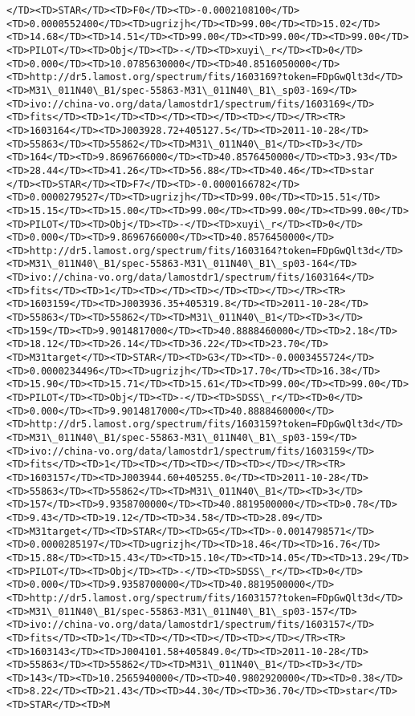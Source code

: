 \documentclass[11pt]{article}
\begin{document}
\begin{Verbatim}[commandchars=\\\{\}]
</TD><TD>STAR</TD><TD>F0</TD><TD>-0.0002108100</TD><TD>0.0000552400</TD><TD>ugrizjh</TD><TD>99.00</TD><TD>15.02</TD><TD>14.68</TD><TD>14.51</TD><TD>99.00</TD><TD>99.00</TD><TD>99.00</TD><TD>PILOT</TD><TD>Obj</TD><TD>-</TD><TD>xuyi\_r</TD><TD>0</TD><TD>0.000</TD><TD>10.0785630000</TD><TD>40.8516050000</TD><TD>http://dr5.lamost.org/spectrum/fits/1603169?token=FDpGwQlt3d</TD><TD>M31\_011N40\_B1/spec-55863-M31\_011N40\_B1\_sp03-169</TD><TD>ivo://china-vo.org/data/lamostdr1/spectrum/fits/1603169</TD><TD>fits</TD><TD>1</TD><TD></TD><TD></TD><TD></TD></TR><TR><TD>1603164</TD><TD>J003928.72+405127.5</TD><TD>2011-10-28</TD><TD>55863</TD><TD>55862</TD><TD>M31\_011N40\_B1</TD><TD>3</TD><TD>164</TD><TD>9.8696766000</TD><TD>40.8576450000</TD><TD>3.93</TD><TD>28.44</TD><TD>41.26</TD><TD>56.88</TD><TD>40.46</TD><TD>star     </TD><TD>STAR</TD><TD>F7</TD><TD>-0.0000166782</TD><TD>0.0000279527</TD><TD>ugrizjh</TD><TD>99.00</TD><TD>15.51</TD><TD>15.15</TD><TD>15.00</TD><TD>99.00</TD><TD>99.00</TD><TD>99.00</TD><TD>PILOT</TD><TD>Obj</TD><TD>-</TD><TD>xuyi\_r</TD><TD>0</TD><TD>0.000</TD><TD>9.8696766000</TD><TD>40.8576450000</TD><TD>http://dr5.lamost.org/spectrum/fits/1603164?token=FDpGwQlt3d</TD><TD>M31\_011N40\_B1/spec-55863-M31\_011N40\_B1\_sp03-164</TD><TD>ivo://china-vo.org/data/lamostdr1/spectrum/fits/1603164</TD><TD>fits</TD><TD>1</TD><TD></TD><TD></TD><TD></TD></TR><TR><TD>1603159</TD><TD>J003936.35+405319.8</TD><TD>2011-10-28</TD><TD>55863</TD><TD>55862</TD><TD>M31\_011N40\_B1</TD><TD>3</TD><TD>159</TD><TD>9.9014817000</TD><TD>40.8888460000</TD><TD>2.18</TD><TD>18.12</TD><TD>26.14</TD><TD>36.22</TD><TD>23.70</TD><TD>M31target</TD><TD>STAR</TD><TD>G3</TD><TD>-0.0003455724</TD><TD>0.0000234496</TD><TD>ugrizjh</TD><TD>17.70</TD><TD>16.38</TD><TD>15.90</TD><TD>15.71</TD><TD>15.61</TD><TD>99.00</TD><TD>99.00</TD><TD>PILOT</TD><TD>Obj</TD><TD>-</TD><TD>SDSS\_r</TD><TD>0</TD><TD>0.000</TD><TD>9.9014817000</TD><TD>40.8888460000</TD><TD>http://dr5.lamost.org/spectrum/fits/1603159?token=FDpGwQlt3d</TD><TD>M31\_011N40\_B1/spec-55863-M31\_011N40\_B1\_sp03-159</TD><TD>ivo://china-vo.org/data/lamostdr1/spectrum/fits/1603159</TD><TD>fits</TD><TD>1</TD><TD></TD><TD></TD><TD></TD></TR><TR><TD>1603157</TD><TD>J003944.60+405255.0</TD><TD>2011-10-28</TD><TD>55863</TD><TD>55862</TD><TD>M31\_011N40\_B1</TD><TD>3</TD><TD>157</TD><TD>9.9358700000</TD><TD>40.8819500000</TD><TD>0.78</TD><TD>9.43</TD><TD>19.12</TD><TD>34.58</TD><TD>28.09</TD><TD>M31target</TD><TD>STAR</TD><TD>G5</TD><TD>-0.0014798571</TD><TD>0.0000285197</TD><TD>ugrizjh</TD><TD>18.46</TD><TD>16.76</TD><TD>15.88</TD><TD>15.43</TD><TD>15.10</TD><TD>14.05</TD><TD>13.29</TD><TD>PILOT</TD><TD>Obj</TD><TD>-</TD><TD>SDSS\_r</TD><TD>0</TD><TD>0.000</TD><TD>9.9358700000</TD><TD>40.8819500000</TD><TD>http://dr5.lamost.org/spectrum/fits/1603157?token=FDpGwQlt3d</TD><TD>M31\_011N40\_B1/spec-55863-M31\_011N40\_B1\_sp03-157</TD><TD>ivo://china-vo.org/data/lamostdr1/spectrum/fits/1603157</TD><TD>fits</TD><TD>1</TD><TD></TD><TD></TD><TD></TD></TR><TR><TD>1603143</TD><TD>J004101.58+405849.0</TD><TD>2011-10-28</TD><TD>55863</TD><TD>55862</TD><TD>M31\_011N40\_B1</TD><TD>3</TD><TD>143</TD><TD>10.2565940000</TD><TD>40.9802920000</TD><TD>0.38</TD><TD>8.22</TD><TD>21.43</TD><TD>44.30</TD><TD>36.70</TD><TD>star</TD><TD>STAR</TD><TD>M
\end{Verbatim}
\end{document}

